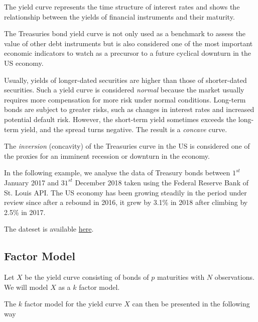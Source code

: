 The yield curve represents the time structure of interest rates and shows the relationship between the yields of financial instruments and their maturity.

The Treasuries bond yield curve is not only used as a benchmark to assess the value of other debt instruments but is also considered one of the most important economic indicators to watch as a precursor to a future cyclical downturn in the US economy.

Usually, yields of longer-dated securities are higher than those of shorter-dated securities. Such a yield curve is considered \emph{normal} because the market usually requires more compensation for more risk under normal conditions. Long-term bonds are subject to greater risks, such as changes in interest rates and increased potential default risk.
However, the short-term yield sometimes exceeds the long-term yield, and the spread turns negative. The result is a \emph{concave} curve.

The \emph{inversion} (concavity) of the Treasuries curve in the US is considered one of the proxies for an imminent recession or downturn in the economy.

In the following example, we analyse the data of Treasury bonds between $1^{st}$ January 2017 and $31^{st}$ December 2018 taken using the Federal Reserve Bank of St. Louis API.
The US economy has been growing steadily in the period under review since after a rebound in 2016, it grew by 3.1\% in 2018 after climbing by 2.5\% in 2017.

The dateset is available \href{https://github.com/matteosan1/finance_course/raw/develop/input_files/DGS_2017_2018.csv"}{here}.

\subsection{Factor Model}
Let $X$ be the yield curve consisting of bonds of $p$ maturities with $N$ observations. We will model $X$ as a $k$ factor model.

The $k$ factor model for the yield curve $X$ can then be presented in the following way

